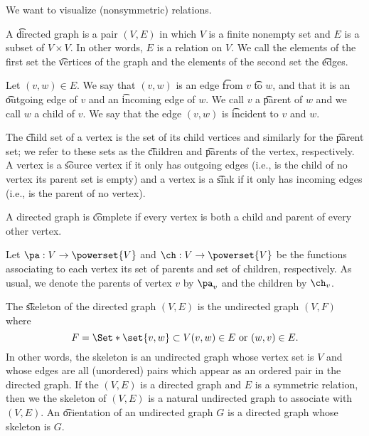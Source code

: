 

We want to visualize (nonsymmetric) relations.


A \t{directed graph} is a pair $(V, E)$ in which $V$ is a finite nonempty set and $E$ is a subset of $V \times V$.
In other words, $E$ is a relation on $V$.
We call the elements of the first set the \t{vertices} of the graph and the elements of the second set the \t{edges}.

Let $(v, w) \in E$.
We say that $(v, w)$ is an edge \t{from} $v$ \t{to} $w$, and that it is an \t{outgoing edge} of $v$ and an \t{incoming edge} of $w$.
We call $v$ a \t{parent} of $w$ and we call $w$ a child of $v$.
We say that the edge $(v, w)$ is \t{incident} to $v$ and $w$.

The \t{child set} of a vertex is the set of its child vertices and similarly for the \t{parent set}; we refer to these sets as the \t{children} and \t{parents} of the vertex, respectively.
A vertex is a \t{source} vertex if it only has outgoing edges (i.e., is the child of no vertex its parent set is empty) and a vertex is a \t{sink} if it only has incoming edges (i.e., is the parent of no vertex).

A directed graph is \t{complete} if every vertex is both a child and parent of every other vertex.


Let $\pa: V \to \powerset{V}$ and $\ch: V \to \powerset{V}$ be the functions associating to each vertex its set of parents and set of children, respectively.
As usual, we denote the parents of vertex $v$ by $\pa_v$ and the children by $\ch_v$.


The \t{skeleton} of the directed graph $(V, E)$ is the undirected graph $(V, F)$ where
\[
  F = \Set*{\set{v, w} \subset V}{(v, w) \in E \text{ or } (w, v) \in E}.
\]
In other words, the skeleton is an undirected graph whose vertex set is $V$ and whose edges are all (unordered) pairs which appear as an ordered pair in the directed graph.
If the $(V, E)$ is a directed graph and $E$ is a symmetric relation, then we the skeleton of $(V, E)$ is a natural undirected graph to associate with $(V, E)$.
An \t{orientation} of an undirected graph $G$ is a directed graph whose skeleton is $G$.



